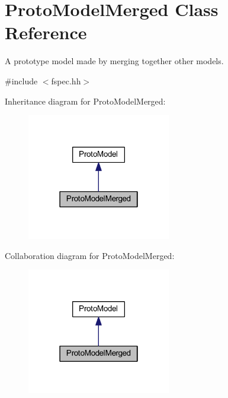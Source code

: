 \hypertarget{class_proto_model_merged}{}\section{Proto\+Model\+Merged Class Reference}
\label{class_proto_model_merged}


A prototype model made by merging together other models.  




{\ttfamily \#include $<$fspec.\+hh$>$}



Inheritance diagram for Proto\+Model\+Merged\+:
\nopagebreak
\begin{figure}[H]
\begin{center}
\leavevmode
\includegraphics[width=178pt]{class_proto_model_merged__inherit__graph}
\end{center}
\end{figure}


Collaboration diagram for Proto\+Model\+Merged\+:
\nopagebreak
\begin{figure}[H]
\begin{center}
\leavevmode
\includegraphics[width=178pt]{class_proto_model_merged__coll__graph}
\end{center}
\end{figure}

